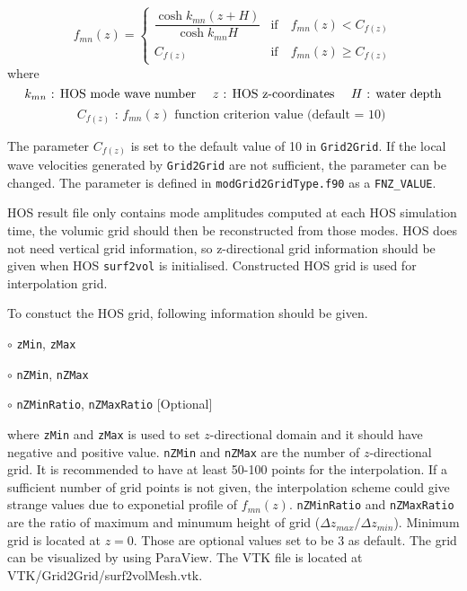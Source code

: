 {
	\begin{equation}
	\label{eq:fnzCriterion}
	f_{mn}(z) = \begin{cases}
	\dfrac{\cosh k_{mn}(z+H)}{\cosh k_{mn}H}  &  \text{if} \quad f_{mn}(z) < C_{f(z)} \\
	C_{f(z)}  &  \text{if} \quad f_{mn}(z) \geq C_{f(z)}
	\end{cases}
	\end{equation}
	\newline
	\centering
	where
	\begin{equation*}
	k_{mn}	\text{ : HOS mode wave number \quad  $z$ : HOS z-coordinates \quad $H$ :  water depth}
	\end{equation*} 
	\begin{equation*}
	C_{f(z)}  \text{ : $f_{mn}(z)$ function criterion value (default = 10) }
	\end{equation*}
}

The parameter $C_{f(z)}$ is set to the default value of  10 in \texttt{Grid2Grid}. If the local wave velocities generated by \texttt{Grid2Grid} are not sufficient, the parameter can be changed. The parameter is defined in \texttt{modGrid2GridType.f90} as a \texttt{FNZ\_VALUE}.

HOS result file only contains mode amplitudes computed at each HOS simulation time, the volumic grid should then be reconstructed from those modes. HOS does not need vertical grid information, so z-directional grid information should be given when HOS \texttt{surf2vol} is initialised. Constructed HOS grid is used for interpolation grid. 

To constuct the HOS grid, following information should be given.

\hspace{0.5 cm} $\circ$ \texttt{zMin}, \texttt{zMax}

\hspace{0.5 cm} $\circ$ \texttt{nZMin}, \texttt{nZMax}

\hspace{0.5 cm} $\circ$ \texttt{nZMinRatio}, \texttt{nZMaxRatio} [Optional]

where \texttt{zMin} and \texttt{zMax} is used to set $z$-directional domain and it should have negative and positive value. \texttt{nZMin} and \texttt{nZMax} are the number of $z$-directional grid. It is recommended to have at least 50-100 points for the interpolation. If a sufficient number of grid points is not given, the interpolation scheme could give strange values due to exponetial profile of $f_{mn}(z)$. \texttt{nZMinRatio} and \texttt{nZMaxRatio} are the ratio of maximum and minumum height of grid (${\Delta z_{max}}/{\Delta z_{min}} $). Minimum grid is located at $z=0$. Those are optional values set to be 3 as default.  The grid can be visualized by using ParaView. The VTK file is located at VTK/Grid2Grid/surf2volMesh.vtk.

